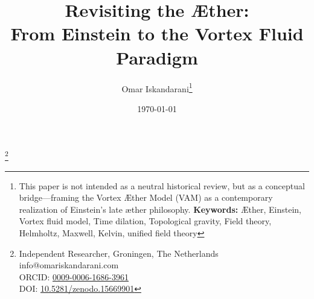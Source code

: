 \documentclass[preprint,notitlepage]{revtex4-2}
\begin{document}
\title{Revisiting the Æther:\\ From Einstein to the Vortex Fluid Paradigm}
\author{Omar Iskandarani\footnote{\scriptsize This paper is not intended as a neutral historical review, but as a conceptual bridge—framing the Vortex Æther Model (VAM) as a contemporary realization of Einstein’s late æther philosophy. \textbf{Keywords:} Æther, Einstein, Vortex fluid model, Time dilation, Topological gravity, Field theory, Helmholtz, Maxwell, Kelvin, unified field theory}}
\thanks{Independent Researcher, Groningen, The Netherlands\\
        info@omariskandarani.com \\
        ORCID: \href{https://orcid.org/0009-0006-1686-3961}{0009-0006-1686-3961} \\
        DOI: \href{https://doi.org/10.5281/zenodo.15669901}{10.5281/zenodo.15669901}}
\date{\today}
\maketitle
\end{document}
